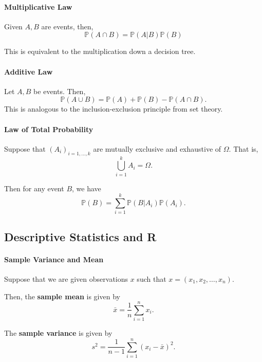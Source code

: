 \paragraph{Multiplicative Law}
Given \(A, B\) are events, then,
\[
    \mathbb{P}(A \cap B) = \mathbb{P}(A | B) \mathbb{P}(B)
\]

This is equivalent to the multiplication down a decision tree.

\paragraph{Additive Law}
Let \(A, B\) be events. Then, \[
    \mathbb{P}(A\cup B) = \mathbb{P}(A) + \mathbb{P}(B) - \mathbb{P}(A \cap B).
\]
This is analogous to the inclusion-exclusion principle from set theory.


\paragraph{Law of Total Probability}
Suppose that \((A_i)_{i = 1, \dots, k}\) are mutually exclusive and
exhaustive of \(\Omega\).
That is, \[
    \bigcup_{i=1}^k A_i = \Omega.
\]

Then for any event \(B\), we have
\[
    \mathbb{P}(B) = \sum_{i=1}^k \mathbb{P}(B | A_i) \mathbb{P}(A_i).
\]

\subsection{Descriptive Statistics and R}

\paragraph{Sample Variance and Mean}
Suppose that we are given observations \(x\) such that
\(x = (x_1, x_2, \dots, x_n)\).

Then, the \textbf{sample mean} is given by
\[
    \bar{x} = \frac{1}{n} \sum_{i=1}^n x_i.
\]

The \textbf{sample variance} is given by
\[
    s^2 = \frac{1}{n-1} \sum_{i=1}^n (x_i - \bar{x})^2.
\]
